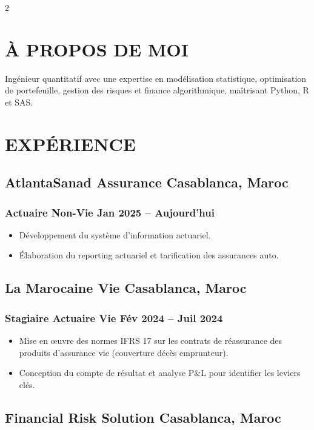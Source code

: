 \documentclass[11pt,asfal]{amdresume}
\begin{document}
\begin{paracol}{2}

\switchcolumn
\section{À PROPOS DE MOI}
Ingénieur quantitatif avec une expertise en modélisation statistique, optimisation de portefeuille, gestion des risques et finance algorithmique, maîtrisant Python, R et SAS.
\vspace{0.1cm}

\section{EXPÉRIENCE}
\subsection{AtlantaSanad Assurance \hfill Casablanca, Maroc}
\subsubsection{Actuaire Non-Vie \dotfill Jan 2025 – Aujourd'hui}
\begin{itemize}
\item Développement du système d'information actuariel.
\item Élaboration du reporting actuariel et tarification des assurances auto.
\end{itemize}

\subsection{La Marocaine Vie \hfill Casablanca, Maroc}
\subsubsection{Stagiaire Actuaire Vie \dotfill Fév 2024 – Juil 2024}
\begin{itemize}
\item Mise en œuvre des normes IFRS 17 sur les contrats de réassurance des produits d'assurance vie (couverture décès emprunteur).
\item Conception du compte de résultat et analyse P\&L pour identifier les leviers clés.
\end{itemize}
{}
\subsection{Financial Risk Solution \hfill Casablanca, Maroc}

\end{paracol}
\end{document}

